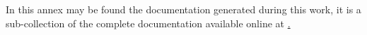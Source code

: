 
In this annex may be found the documentation generated during this work, it is
a sub-collection of the complete documentation available online at
\href{https://fda.readthedocs.io/en/latest/}.



